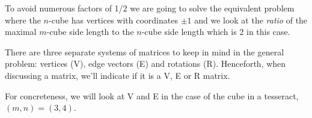 \documentclass[superscriptaddress,reprint,amsmath,amssymb,aps]{revtex4-1}
\begin{document}
\vspace{.15in}

To avoid numerous factors of 1/2 we are going to solve the equivalent problem
where the $n$-cube has vertices with coordinates $\pm1$ and we look at the
{\it ratio} of the maximal $m$-cube side length to the $n$-cube side length
which is 2 in this case.

There are three separate systems of matrices to keep in mind in the general
problem: vertices (V), edge vectors (E) and rotations (R). Henceforth, when
discussing a matrix, we'll indicate if it is a V, E or R matrix.

For concreteness, we will look at V and E in the case of the cube in a
tesseract, $(m,n) = (3,4)$.

\vspace{.15in}
\end{document}
